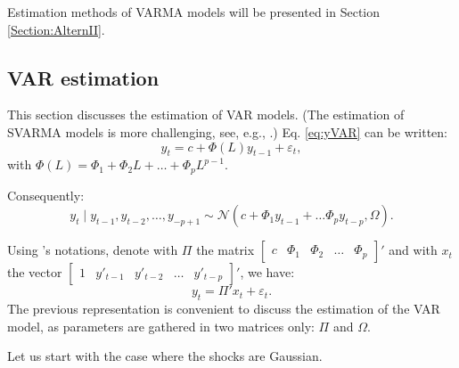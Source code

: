 \documentclass[
  12pt,
]{book}
\theoremstyle{definition}
\theoremstyle{definition}
\theoremstyle{definition}
\theoremstyle{definition}
\theoremstyle{remark}
\begin{document}
Estimation methods of VARMA models will be presented in Section \ref{Section:AlternII}.

\hypertarget{estimVAR}{%
\subsection{VAR estimation}\label{estimVAR}}

This section discusses the estimation of VAR models. (The estimation of SVARMA models is more challenging, see, e.g., \citet{Gourieroux_Monfort_Renne_2020}.) Eq. \eqref{eq:yVAR} can be written:
\[
y_{t}=c+\Phi(L)y_{t-1}+\varepsilon_{t},
\]
with \(\Phi(L) = \Phi_1 + \Phi_2 L + \dots + \Phi_p L^{p-1}\).

Consequently:
\[
y_{t}\mid y_{t-1},y_{t-2},\ldots,y_{-p+1}\sim \mathcal{N}(c+\Phi_{1}y_{t-1}+\ldots\Phi_{p}y_{t-p},\Omega).
\]

Using \citet{Hamilton_1994}'s notations, denote with \(\Pi\) the matrix \(\left[\begin{array}{ccccc} c & \Phi_{1} & \Phi_{2} & \ldots & \Phi_{p}\end{array}\right]'\) and with \(x_{t}\) the vector \(\left[\begin{array}{ccccc} 1 & y'_{t-1} & y'_{t-2} & \ldots & y'_{t-p}\end{array}\right]'\), we have:
\begin{equation}
y_{t}= \Pi'x_{t} + \varepsilon_{t}. \label{eq:PIVAR}
\end{equation}
The previous representation is convenient to discuss the estimation of the VAR model, as parameters are gathered in two matrices only: \(\Pi\) and \(\Omega\).

Let us start with the case where the shocks are Gaussian.
\end{document}
